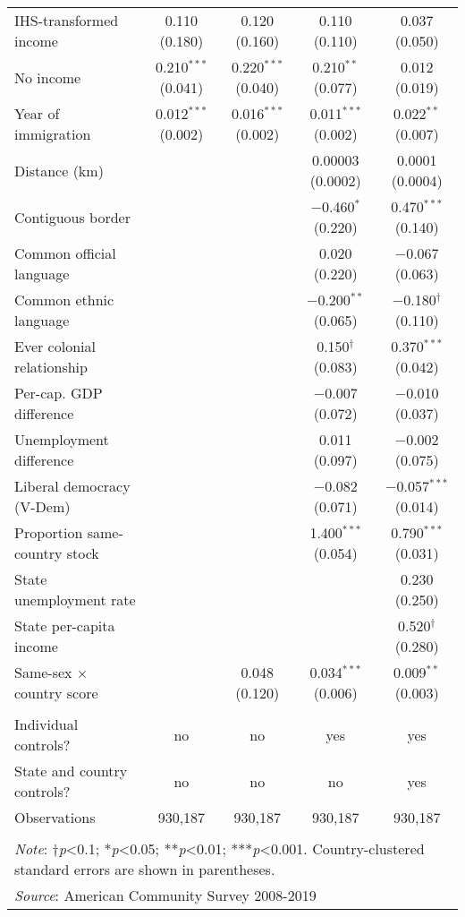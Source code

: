 \documentclass[
  11pt,
]{article}
\begin{document}
\begin{table}[H]
\begin{tabular}{@{\extracolsep{5pt}}lcccc}
  IHS-transformed income & 0.110 (0.180) & 0.120 (0.160) & 0.110 (0.110) & 0.037 (0.050) \\ 
  No income & 0.210$^{***}$ (0.041) & 0.220$^{***}$ (0.040) & 0.210$^{**}$ (0.077) & 0.012 (0.019) \\ 
  Year of immigration & 0.012$^{***}$ (0.002) & 0.016$^{***}$ (0.002) & 0.011$^{***}$ (0.002) & 0.022$^{**}$ (0.007) \\ 
  Distance (km) &  &  & 0.00003 (0.0002) & 0.0001 (0.0004) \\ 
  Contiguous border &  &  & $-$0.460$^{*}$ (0.220) & 0.470$^{***}$ (0.140) \\ 
  Common official language &  &  & 0.020 (0.220) & $-$0.067 (0.063) \\ 
  Common ethnic language &  &  & $-$0.200$^{**}$ (0.065) & $-$0.180$^{†}$ (0.110) \\ 
  Ever colonial relationship &  &  & 0.150$^{†}$ (0.083) & 0.370$^{***}$ (0.042) \\ 
  Per-cap. GDP difference &  &  & $-$0.007 (0.072) & $-$0.010 (0.037) \\ 
  Unemployment difference &  &  & 0.011 (0.097) & $-$0.002 (0.075) \\ 
  Liberal democracy (V-Dem) &  &  & $-$0.082 (0.071) & $-$0.057$^{***}$ (0.014) \\ 
  Proportion same-country stock &  &  & 1.400$^{***}$ (0.054) & 0.790$^{***}$ (0.031) \\ 
  State unemployment rate &  &  &  & 0.230 (0.250) \\ 
  State per-capita income &  &  &  & 0.520$^{†}$ (0.280) \\ 
  Same-sex × country score &  & 0.048 (0.120) & 0.034$^{***}$ (0.006) & 0.009$^{**}$ (0.003) \\ 
 \hline \\[-1.8ex] 
Individual controls? & no & no & yes & yes \\ 
State and country controls? & no & no & no & yes \\ 
Observations & 930,187 & 930,187 & 930,187 & 930,187 \\ 
\hline 
\hline \\[-1.8ex] 
\multicolumn{5}{l}{\parbox[t]{\textwidth}{\textit{Note}: †\textit{p}<0.1; *\textit{p}<0.05; **\textit{p}<0.01; ***\textit{p}<0.001. Country-clustered standard errors are shown in parentheses.}} \\ 
\multicolumn{5}{l}{\textit{Source}: American Community Survey 2008-2019} \\ 
\end{tabular} 
\end{table}
\end{document}
